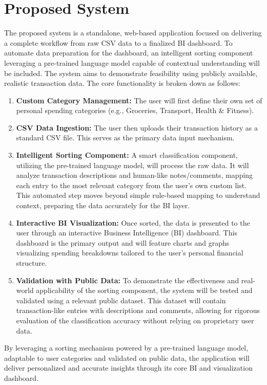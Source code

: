 \documentclass[11pt,a4paper]{report}
\begin{document}
\section{Proposed System}
The proposed system is a standalone, web-based application focused on delivering a complete workflow from raw CSV data to a finalized BI dashboard. To automate data preparation for the dashboard, an intelligent sorting component leveraging a pre-trained language model capable of contextual understanding will be included. The system aims to demonstrate feasibility using publicly available, realistic transaction data. The core functionality is broken down as follows:

\begin{enumerate}
	\item \textbf{Custom Category Management:} The user will first define their own set of personal spending categories (e.g., Groceries, Transport, Health \& Fitness).
	\item \textbf{CSV Data Ingestion:} The user then uploads their transaction history as a standard CSV file. This serves as the primary data input mechanism.
	\item \textbf{Intelligent Sorting Component:} A smart classification component, utilizing the pre-trained language model, will process the raw data. It will analyze transaction descriptions and human-like notes/comments, mapping each entry to the most relevant category from the user's own custom list. This automated step moves beyond simple rule-based mapping to understand context, preparing the data accurately for the BI layer.
	\item \textbf{Interactive BI Visualization:} Once sorted, the data is presented to the user through an interactive Business Intelligence (BI) dashboard. This dashboard is the primary output and will feature charts and graphs visualizing spending breakdowns tailored to the user's personal financial structure.
	\item \textbf{Validation with Public Data:} To demonstrate the effectiveness and real-world applicability of the sorting component, the system will be tested and validated using a relevant public dataset. This dataset will contain transaction-like entries with descriptions and comments, allowing for rigorous evaluation of the classification accuracy without relying on proprietary user data.
\end{enumerate}
By leveraging a sorting mechanism powered by a pre-trained language model, adaptable to user categories and validated on public data, the application will deliver personalized and accurate insights through its core BI and visualization dashboard.
\end{document}
